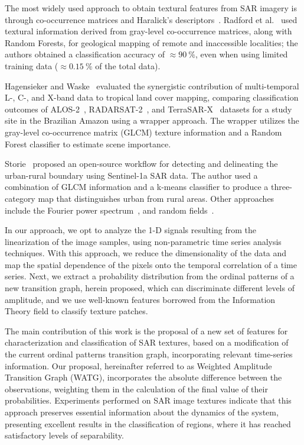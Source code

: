 \documentclass[journal]{IEEEtran}
\begin{document}
	The most widely used approach to obtain textural features from SAR imagery is through co-occurrence matrices and Haralick's descriptors~\cite{yu2019detection}.
	Radford et al.~\cite{radford2018geological} used textural information derived from gray-level co-occurrence matrices, along with Random Forests, for geological mapping of remote and inaccessible localities; the authors obtained a classification accuracy of $\approx\SI{90}{\percent}$, even when using limited training data ($\approx\SI{0.15}{\percent}$ of the total data). 
	
	Hagensieker and Waske~\cite{hagensieker2018evaluation} evaluated the synergistic contribution of multi-temporal L-, C-, and X-band data to tropical land cover mapping, comparing classification outcomes of ALOS-2~\cite{kankaku2013alos}, RADARSAT-2~\cite{morena2004introduction}, and TerraSAR-X~\cite{breit2009terrasar} 
	datasets for a study site in the Brazilian Amazon using a wrapper approach. 
	The wrapper utilizes the gray-level co-occurrence matrix (GLCM)
	texture information and a  Random Forest classifier to estimate scene importance. 
	
	Storie~\cite{storie2018urban} proposed an open-source workflow for detecting and delineating the urban-rural boundary using Sentinel-1a SAR data.
	The author used a combination of GLCM information and a k-means classifier to produce a three-category map that distinguishes urban from rural areas. 
	Other approaches include the Fourier power  spectrum~\cite{Florindo2012Fractal}, and random fields~\cite{zhu2016antarctic}.
	
	In our approach, we opt to analyze the 1-D signals resulting from the linearization of the image samples, using non-parametric time series analysis techniques.
	With this approach, we reduce the dimensionality of the data and map the spatial dependence of the pixels onto the temporal correlation of a time series.
	Next, we extract a probability distribution from the ordinal patterns of a new transition graph, herein proposed, which can discriminate different levels of amplitude, and we use well-known features borrowed from the Information Theory field to classify texture patches.
	
	The main contribution of this work is the proposal of a new set of features for characterization and classification of SAR textures, based on a modification of the current ordinal patterns transition graph, incorporating relevant time-series information.
	Our proposal, hereinafter referred to as Weighted Amplitude Transition Graph (WATG), incorporates the absolute difference between the observations, weighting them in the calculation of the final value of their probabilities.
	Experiments performed on SAR image textures indicate that this approach preserves essential information about the dynamics of the system, presenting excellent results in the classification of regions, where it has reached satisfactory levels of separability.
	
\end{document}
